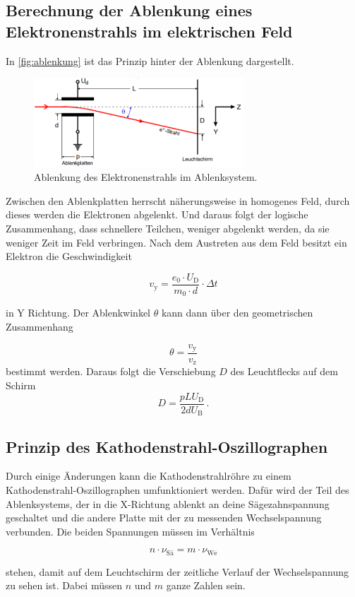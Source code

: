 \subsection{Berechnung der Ablenkung eines Elektronenstrahls im elektrischen Feld}
\label{ssec:t2}

In \autoref{fig:ablenkung} ist das Prinzip hinter der Ablenkung dargestellt.

\begin{figure}
    \centering
    \includegraphics[width=0.7\textwidth]{images/bild2.png}
    \caption{Ablenkung des Elektronenstrahls im Ablenksystem.\cite{V501}}
    \label{fig:ablenkung}
\end{figure}

Zwischen den Ablenkplatten herrscht näherungsweise in homogenes Feld, durch dieses werden die Elektronen abgelenkt.
Und daraus folgt der logische Zusammenhang, dass schnellere Teilchen, weniger abgelenkt werden, da sie weniger Zeit im Feld verbringen.
Nach dem Austreten aus dem Feld besitzt ein Elektron die Geschwindigkeit

\begin{equation}
    v_\text{y} = \frac{e_0 \cdot U_\text{D}}{m_0 \cdot d} \cdot \Delta t
    \label{eq:yges}
\end{equation}

in Y Richtung.
Der Ablenkwinkel $\theta$ kann dann über den geometrischen Zusammenhang

\begin{equation}
    \theta = \frac{v_\text{y}}{v_\text{z}}
    \label{eq:theta1}
\end{equation}
bestimmt werden.
Daraus folgt die Verschiebung $D$ des Leuchtflecks auf dem Schirm
\begin{equation}
    D = \frac{p L U_\text{D}}{2 d U_\text{B}} \, .
    \label{eq:verschiebung}
\end{equation}


\subsection{Prinzip des Kathodenstrahl-Oszillographen}
\label{ssec:t3}

Durch einige Änderungen kann die Kathodenstrahlröhre zu einem Kathodenstrahl-Oszillographen umfunktioniert werden.
Dafür wird der Teil des Ablenksystems, der in die X-Richtung ablenkt an deine Sägezahnspannung geschaltet und die andere Platte mit der zu messenden Wechselspannung verbunden.
Die beiden Spannungen müssen im Verhältnis 

\begin{equation}
n \cdot \nu _\text{Sä} = m \cdot \nu _\text{We}
    \label{eq:verh}
\end{equation}

stehen, damit auf dem Leuchtschirm der zeitliche Verlauf der Wechselspannung zu sehen ist.
Dabei müssen $n$ und $m$ ganze Zahlen sein.